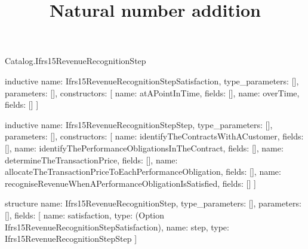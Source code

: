 \begin{lexlean}{Catalog.Ifrs15RevenueRecognitionStep}
\title{Natural number addition}
\begin{semanticmodule}
inductive{
  name: Ifrs15RevenueRecognitionStepSatisfaction,
  type_parameters: [],
  parameters: [],
  constructors: [
    {name: atAPointInTime, fields: []},
    {name: overTime, fields: []}
  ]
}

inductive{
  name: Ifrs15RevenueRecognitionStepStep,
  type_parameters: [],
  parameters: [],
  constructors: [
    {name: identifyTheContractsWithACustomer, fields: []},
    {name: identifyThePerformanceObligationsInTheContract, fields: []},
    {name: determineTheTransactionPrice, fields: []},
    {name: allocateTheTransactionPriceToEachPerformanceObligation, fields: []},
    {name: recogniseRevenueWhenAPerformanceObligationIsSatisfied, fields: []}
  ]
}

structure{
  name: Ifrs15RevenueRecognitionStep,
  type_parameters: [],
  parameters: [],
  fields: [
    {name: satisfaction, type: (Option Ifrs15RevenueRecognitionStepSatisfaction)},
    {name: step, type: Ifrs15RevenueRecognitionStepStep}
  ]
}
\end{semanticmodule}
\end{lexlean}
